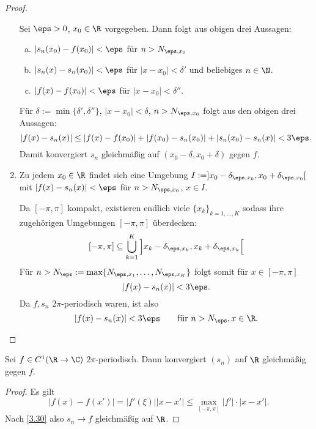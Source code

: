 \begin{st}
\begin{proof}
\begin{enumerate}[1)]
				Sei $\eps > 0$, $x_0 \in \R$ vorgegeben.
				Dann folgt aus obigen drei Aussagen:
				\begin{enumerate}[a)]
					\item
						$|s_n(x_0) - f(x_0)| < \eps$ für $n > N_{\eps, x_0}$
					\item
						$|s_n(x) - s_n(x_0)| < \eps$ für $|x-x_0| < \delta'$ und beliebiges $n\in \N$.
					\item
						$|f(x) - f(x_0)| < \eps$ für $|x-x_0| < \delta''$.
				\end{enumerate}
				Für $\delta := \min\{\delta', \delta''\}$, $|x-x_0| < \delta$, $n > N_{\eps, x_0}$ folgt aus den obigen drei Aussagen:
				\[
					|f(x) - s_n(x)| 
					\le |f(x) - f(x_0)| + |f(x_0)-s_n(x_0)| + |s_n(x_0) - s_n(x)|
					< 3\eps.
				\]
				Damit konvergiert $s_n$ gleichmäßig auf $(x_0-\delta, x_0+\delta)$ gegen $f$.
			\item
				Zu jedem $x_0 \in \R$ findet sich eine Umgebung $I := ]x_0-\delta_{\eps, x_0}, x_0 + \delta_{\eps, x_0}[$ mit $|f(x) - s_n(x)| < \eps$ für $n > N_{\eps, x_0}$, $x \in  I$.

				Da $[-\pi,\pi]$ kompakt, existieren endlich viele $\{x_k\}_{k=1,\dotsc,K}$ sodass ihre zugehörigen Umgebungen $[-\pi, \pi]$ überdecken:
				\[
					[-\pi,\pi] \subset \bigcup_{k=1}^K \Big] x_k - \delta_{\eps, x_k}, x_k + \delta_{\eps, x_k} \Big[
				\]
				Für $n > N_\eps := \max\{N_{\eps, x_1}, \dotsc, N_{\eps, x_K}\}$ folgt somit für $x \in [-\pi,\pi]$
				\[
					|f(x) - s_n(x)| < 3\eps.
				\]
				Da $f, s_n$ $2\pi$-periodisch waren, ist also
				\[
					|f(x) - s_n(x)| < 3\eps \qquad \text{für $n> N_\eps, x\in \R$.}
				\]
		\end{enumerate}
	\end{proof}
\end{st}

\begin{kor} \label{3.31}
	Sei $f \in C^1(\R \to \C)$ $2\pi$-periodisch.
	Dann konvergiert $(s_n)$ auf $\R$ gleichmäßig gegen $f$.
	\begin{proof}
		Es gilt
		\[
			|f(x) - f(x')| = |f'(\xi)||x-x'| \le \max_{[-\pi,\pi]} |f'|\cdot |x-x'|.
		\]
		Nach \ref{3.30} also $s_n \to f$ gleichmäßig auf $\R$.
	\end{proof}
\end{kor}

